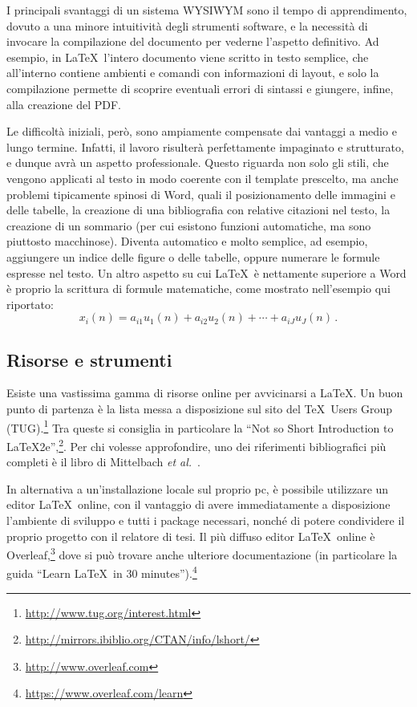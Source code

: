 \documentclass[12pt]{report}
\begin{document}
I principali svantaggi di un sistema WYSIWYM sono il tempo di apprendimento, dovuto a una minore intuitività degli strumenti software, e la necessità di invocare la compilazione del documento per vederne l'aspetto definitivo. Ad esempio, in \LaTeX\ l'intero documento viene scritto in testo semplice, che all'interno contiene ambienti e comandi con informazioni di layout, e solo la compilazione permette di scoprire eventuali errori di sintassi e giungere, infine, alla creazione del PDF.

Le difficoltà iniziali, però, sono ampiamente compensate dai vantaggi a medio e lungo termine. Infatti, il lavoro risulterà perfettamente impaginato e strutturato, e dunque avrà un aspetto professionale. Questo riguarda non solo gli stili, che vengono applicati al testo in modo coerente con il template prescelto, ma anche problemi tipicamente spinosi di Word, quali il posizionamento delle immagini e delle tabelle, la creazione di una bibliografia con relative citazioni nel testo, la creazione di un sommario (per cui esistono funzioni automatiche, ma sono piuttosto macchinose). Diventa automatico e molto semplice, ad esempio, aggiungere un indice delle figure o delle tabelle, oppure numerare le formule espresse nel testo. Un altro aspetto su cui \LaTeX\ è nettamente superiore a Word è proprio la scrittura di formule matematiche, come mostrato nell'esempio qui riportato:
\begin{equation}
x_i(n) = a_{i1}u_1(n) + a_{i2}u_2(n) + \cdots + a_{iJ}u_J(n) \, .
\label{eq:multimix}
\end{equation}

\subsection{Risorse e strumenti}

Esiste una vastissima gamma di risorse online per avvicinarsi a \LaTeX. Un buon punto di partenza \`e la lista messa a disposizione sul sito del \TeX\ Users Group (TUG).\footnote{\url{http://www.tug.org/interest.html}}
Tra queste si consiglia in particolare la ``Not so Short Introduction to LaTeX2e'',\footnote{\url{http://mirrors.ibiblio.org/CTAN/info/lshort/}}. Per chi volesse approfondire, uno dei riferimenti bibliografici pi\`u completi \`e il libro di Mittelbach {\em et al.}~\cite{mittelbach2004latex}.

In alternativa a un'installazione locale sul proprio pc, \`e possibile utilizzare un editor \LaTeX\ online, con il vantaggio di avere immediatamente a disposizione l'ambiente di sviluppo e tutti i package necessari, nonch\'e di potere condividere il proprio progetto con il relatore di tesi. Il pi\`u diffuso editor \LaTeX\ online \`e Overleaf,\footnote{\url{http://www.overleaf.com}} dove si pu\`o trovare anche ulteriore documentazione (in particolare la guida ``Learn \LaTeX\ in 30 minutes'').\footnote{\url{https://www.overleaf.com/learn}}
\end{document}
